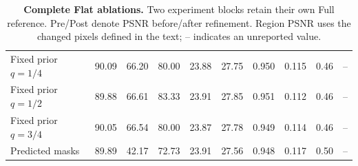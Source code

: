 \begin{table}[t]
\begin{tabular}{@{}l*{9}{r}@{}}
Fixed prior $q=1/4$ & 90.09 & 66.20 & 80.00 & 23.88 & 27.75 & 0.950 & 0.115 & 0.46 & -- \\
Fixed prior $q=1/2$ & 89.88 & 66.61 & 83.33 & 23.91 & 27.85 & 0.951 & 0.112 & 0.46 & -- \\
Fixed prior $q=3/4$ & 90.05 & 66.54 & 80.00 & 23.87 & 27.78 & 0.949 & 0.114 & 0.46 & -- \\
Predicted masks & 89.89 & 42.17 & 72.73 & 23.91 & 27.56 & 0.948 & 0.117 & 0.50 & -- \\
\bottomrule
\end{tabular}
\caption{\textbf{Complete Flat ablations.} Two experiment blocks retain their own Full reference. Pre/Post denote PSNR before/after refinement. Region PSNR uses the changed pixels defined in the text; -- indicates an unreported value.}
\label{tab:supp_ablations}
\end{table}
